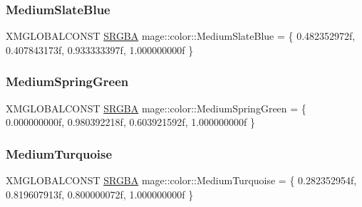 \hypertarget{namespacemage_1_1color_a624570fd8079b101e1d943240c6f8d69}{}\label{namespacemage_1_1color_a624570fd8079b101e1d943240c6f8d69} 
\subsubsection{\texorpdfstring{Medium\+Slate\+Blue}{MediumSlateBlue}}
{\footnotesize\ttfamily X\+M\+G\+L\+O\+B\+A\+L\+C\+O\+N\+ST \hyperlink{structmage_1_1_s_r_g_b_a}{S\+R\+G\+BA} mage\+::color\+::\+Medium\+Slate\+Blue = \{ 0.\+482352972f, 0.\+407843173f, 0.\+933333397f, 1.\+000000000f \}}

\hypertarget{namespacemage_1_1color_a778d15a5410b97b78afb0a05e6c730b4}{}\label{namespacemage_1_1color_a778d15a5410b97b78afb0a05e6c730b4} 
\subsubsection{\texorpdfstring{Medium\+Spring\+Green}{MediumSpringGreen}}
{\footnotesize\ttfamily X\+M\+G\+L\+O\+B\+A\+L\+C\+O\+N\+ST \hyperlink{structmage_1_1_s_r_g_b_a}{S\+R\+G\+BA} mage\+::color\+::\+Medium\+Spring\+Green = \{ 0.\+000000000f, 0.\+980392218f, 0.\+603921592f, 1.\+000000000f \}}

\hypertarget{namespacemage_1_1color_ae5f2fc39acc639e47c8c9564f3faa2a9}{}\label{namespacemage_1_1color_ae5f2fc39acc639e47c8c9564f3faa2a9} 
\subsubsection{\texorpdfstring{Medium\+Turquoise}{MediumTurquoise}}
{\footnotesize\ttfamily X\+M\+G\+L\+O\+B\+A\+L\+C\+O\+N\+ST \hyperlink{structmage_1_1_s_r_g_b_a}{S\+R\+G\+BA} mage\+::color\+::\+Medium\+Turquoise = \{ 0.\+282352954f, 0.\+819607913f, 0.\+800000072f, 1.\+000000000f \}}

\hypertarget{namespacemage_1_1color_a07c4737644b67f7a05c82385001511d8}{}\label{namespacemage_1_1color_a07c4737644b67f7a05c82385001511d8} 
